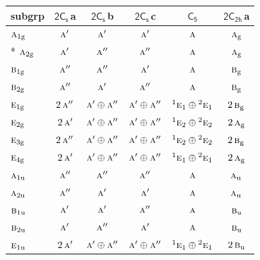 \documentclass[10pt,a4paper]{article}
\numberwithin{equation}{section}
\newcommand{\grp}[1]{\mathsf{#1}}
\newcommand{\irr}[1]{\text{\normalfont\scshape #1}}
\newcommand{\conjpair}[1]{{}^{#1}}
\newcommand{\ptag}[1]{\mathrm{#1}}
\newcommand{\clsletter}[1]{\,{\scriptsize\color{black!55}#1}}
\begin{document}
{\small\begin{longtable}{@{}lccccc@{}}\toprule
subgrp & \href{2C1v.pdf}{$\grp{2C_{s}}$}\clsletter{a} & \href{2C1v.pdf}{$\grp{2C_{s}}$}\clsletter{b} & \href{2C1v.pdf}{$\grp{2C_{s}}$}\clsletter{c} & \href{C5.pdf}{$\grp{C_{5}}$} & \href{2C2h.pdf}{$\grp{2C_{2h}}$}\clsletter{a}\\\midrule\endhead
\bottomrule\endfoot\endlastfoot
$\irr{a}_{1\ptag{g}}$ & $\irr{a}'$ & $\irr{a}'$ & $\irr{a}'$ & $\irr{a}$ & $\irr{a}_{\ptag{g}}$\\*
$\irr{a}_{2\ptag{g}}$ & $\irr{a}'$ & $\irr{a}''$ & $\irr{a}''$ & $\irr{a}$ & $\irr{a}_{\ptag{g}}$\\
$\irr{b}_{1\ptag{g}}$ & $\irr{a}''$ & $\irr{a}''$ & $\irr{a}'$ & $\irr{a}$ & $\irr{b}_{\ptag{g}}$\\
$\irr{b}_{2\ptag{g}}$ & $\irr{a}''$ & $\irr{a}'$ & $\irr{a}''$ & $\irr{a}$ & $\irr{b}_{\ptag{g}}$\\
$\irr{e}_{1\ptag{g}}$ & $2\,\irr{a}''$ & $\irr{a}'\oplus \irr{a}''$ & $\irr{a}'\oplus \irr{a}''$ & $\conjpair{1}\irr{e}_{1}\oplus \conjpair{2}\irr{e}_{1}$ & $2\,\irr{b}_{\ptag{g}}$\\
$\irr{e}_{2\ptag{g}}$ & $2\,\irr{a}'$ & $\irr{a}'\oplus \irr{a}''$ & $\irr{a}'\oplus \irr{a}''$ & $\conjpair{1}\irr{e}_{2}\oplus \conjpair{2}\irr{e}_{2}$ & $2\,\irr{a}_{\ptag{g}}$\\
$\irr{e}_{3\ptag{g}}$ & $2\,\irr{a}''$ & $\irr{a}'\oplus \irr{a}''$ & $\irr{a}'\oplus \irr{a}''$ & $\conjpair{1}\irr{e}_{2}\oplus \conjpair{2}\irr{e}_{2}$ & $2\,\irr{b}_{\ptag{g}}$\\
$\irr{e}_{4\ptag{g}}$ & $2\,\irr{a}'$ & $\irr{a}'\oplus \irr{a}''$ & $\irr{a}'\oplus \irr{a}''$ & $\conjpair{1}\irr{e}_{1}\oplus \conjpair{2}\irr{e}_{1}$ & $2\,\irr{a}_{\ptag{g}}$\\
$\irr{a}_{1\ptag{u}}$ & $\irr{a}''$ & $\irr{a}''$ & $\irr{a}''$ & $\irr{a}$ & $\irr{a}_{\ptag{u}}$\\
$\irr{a}_{2\ptag{u}}$ & $\irr{a}''$ & $\irr{a}'$ & $\irr{a}'$ & $\irr{a}$ & $\irr{a}_{\ptag{u}}$\\
$\irr{b}_{1\ptag{u}}$ & $\irr{a}'$ & $\irr{a}'$ & $\irr{a}''$ & $\irr{a}$ & $\irr{b}_{\ptag{u}}$\\
$\irr{b}_{2\ptag{u}}$ & $\irr{a}'$ & $\irr{a}''$ & $\irr{a}'$ & $\irr{a}$ & $\irr{b}_{\ptag{u}}$\\
$\irr{e}_{1\ptag{u}}$ & $2\,\irr{a}'$ & $\irr{a}'\oplus \irr{a}''$ & $\irr{a}'\oplus \irr{a}''$ & $\conjpair{1}\irr{e}_{1}\oplus \conjpair{2}\irr{e}_{1}$ & $2\,\irr{b}_{\ptag{u}}$\\

\end{longtable}}
\end{document}

